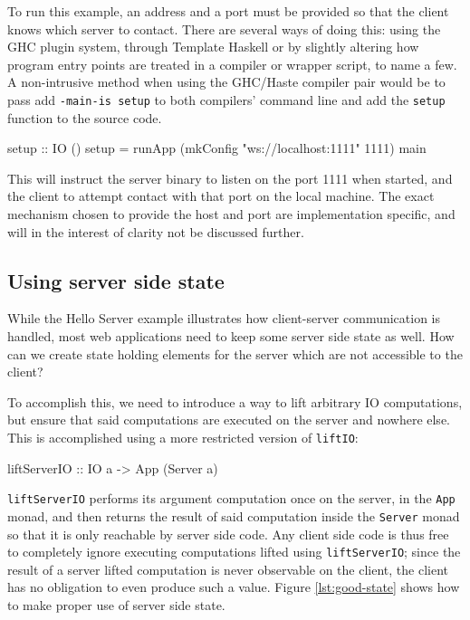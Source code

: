 \documentclass[preprint]{sigplanconf}
\begin{document}
To run this example, an address and a port must be provided so that the client
knows which server to contact. There are several ways of doing this:
using the GHC plugin system, through Template Haskell or by slightly altering
how program entry points are treated in a compiler or wrapper script, to name
a few. A non-intrusive method when using the GHC/Haste compiler pair would
be to pass add \lstinline!-main-is setup! to both compilers' command line
and add the \lstinline!setup! function to the source code.

\begin{code}
setup :: IO ()
setup =
  runApp (mkConfig "ws://localhost:1111" 1111) main
\end{code}

This will instruct the server binary to listen on the port 1111 when
started, and the client to attempt contact with that port on the local machine.
The exact mechanism chosen to provide the host and port are implementation
specific, and will in the interest of clarity not be discussed further.

\subsection{Using server side state}

While the Hello Server example illustrates how client-server communication is
handled, most web applications need to keep some server side state as well.
How can we create state holding elements for the server which are not
accessible to the client?

To accomplish this, we need to introduce a way to lift arbitrary IO
computations, but ensure that said computations are executed on the server and
nowhere else. This is accomplished using a more restricted version of
\lstinline!liftIO!:

\begin{code}
liftServerIO :: IO a -> App (Server a)
\end{code}

\lstinline!liftServerIO! performs its argument computation once on the server,
in the \lstinline!App! monad, and then returns the result of said computation
inside the \lstinline!Server! monad so that it is only reachable by server side
code.
Any client side code is thus free to completely ignore executing
computations lifted using \lstinline!liftServerIO!; since the result of a
server lifted computation is never observable on the client, the client has no
obligation to even produce such a value. Figure \ref{lst:good-state} shows how
to make proper use of server side state.
\end{document}
